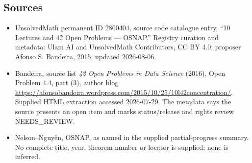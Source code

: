 \documentclass[11pt]{article}
\begin{document}
\subsection{Sources}
\begin{itemize}
\item UnsolvedMath permanent ID 2800404, source code catalogue entry, ``10 Lectures and 42 Open Problems --- OSNAP.'' Registry curation and metadata: Ulam AI and UnsolvedMath Contributors, CC BY 4.0; proposer Afonso S. Bandeira, 2015; updated 2026-08-06.
\item Bandeira, source list \emph{42 Open Problems in Data Science} (2016), Open Problem 4.4, part (3), author blog \url{https://afonsobandeira.wordpress.com/2015/10/25/10l42concentration/}. Supplied HTML extraction accessed 2026-07-29. The metadata says the source presents an open item and marks status/release and rights review NEEDS\_REVIEW.
\item Nelson--Nguyên, OSNAP, as named in the supplied partial-progress summary. No complete title, year, theorem number or locator is supplied; none is inferred.
\end{itemize}
\end{document}
